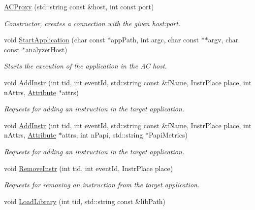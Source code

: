 \begin{DoxyCompactItemize}
\item 
\hyperlink{class_a_c_proxy_a395f873fbecc46af138ab7a40652495d}{A\-C\-Proxy} (std\-::string const \&host, int const port)
\begin{DoxyCompactList}\small\item\em Constructor, creates a connection with the given host\-:port. \end{DoxyCompactList}\item 
void \hyperlink{class_a_c_proxy_ab02ac264f88bf1211cd9e4545b68464c}{Start\-Application} (char const $\ast$app\-Path, int argc, char const $\ast$$\ast$argv, char const $\ast$analyzer\-Host)
\begin{DoxyCompactList}\small\item\em Starts the execution of the application in the A\-C host. \end{DoxyCompactList}\item 
void \hyperlink{class_a_c_proxy_a42bc3e502d4323977709754c151a84dc}{Add\-Instr} (int tid, int event\-Id, std\-::string const \&f\-Name, Instr\-Place place, int n\-Attrs, \hyperlink{class_common_1_1_attribute}{Attribute} $\ast$attrs)
\begin{DoxyCompactList}\small\item\em Requests for adding an instruction in the target application. \end{DoxyCompactList}\item 
void \hyperlink{class_a_c_proxy_a7108a2970c45fdb383e6e489c4ecf1de}{Add\-Instr} (int tid, int event\-Id, std\-::string const \&f\-Name, Instr\-Place place, int n\-Attrs, \hyperlink{class_common_1_1_attribute}{Attribute} $\ast$attrs, int n\-Papi, std\-::string $\ast$Papi\-Metrics)
\begin{DoxyCompactList}\small\item\em Requests for adding an instruction in the target application. \end{DoxyCompactList}\item 
void \hyperlink{class_a_c_proxy_a6ce9980791670743c670cc216080530e}{Remove\-Instr} (int tid, int event\-Id, Instr\-Place place)
\begin{DoxyCompactList}\small\item\em Requests for removing an instruction from the target application. \end{DoxyCompactList}\item 
void \hyperlink{class_a_c_proxy_a8e0711448c89cdacf4b7dc89ac4f6e0b}{Load\-Library} (int tid, std\-::string const \&lib\-Path)
$$
\end{DoxyCompactItemize}
